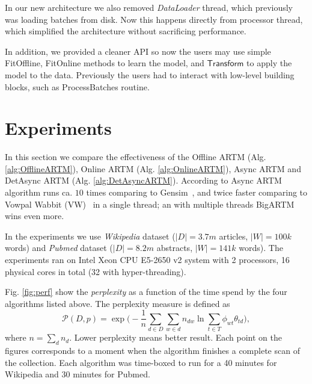 \documentclass[russian,english]{llncs}
\newcommand{\kw}[1]{\textsf{#1}}
\begin{document}
In our new architecture we also removed \emph{DataLoader} thread, which previously was loading batches from disk.
Now this happens directly from processor thread, which simplified the architecture without sacrificing performance.

In addition, we provided a cleaner API so now the users may use simple \kw{FitOffline}, \kw{FitOnline} methods to learn the model,
and $\kw{Transform}$ to apply the model to the data.
Previously the users had to interact with low-level building blocks, such as \kw{ProcessBatches} routine.

\section{Experiments}
\label{sec:Experiments}

In this section we compare the effectiveness of the
\kw{Offline ARTM} (Alg. \ref{alg:OfflineARTM}),
\kw{Online ARTM} (Alg. \ref{alg:OnlineARTM}),
\kw{Async ARTM} \cite{vfardi15aist} and
\kw{DetAsync ARTM} (Alg. \ref{alg:DetAsyncARTM}).
According to \cite{vfardi15aist} \kw{Async ARTM} algorithm
runs ca. $10$ times comparing to Gensim~\cite{rehurek10software},
and twice faster comparing to 
Vowpal Wabbit (VW)~\cite{langford07vw}
in a single thread;
an with multiple threads BigARTM wins even more.

In the experiments we use \emph{Wikipedia} dataset ($|D| = 3.7m$ articles, $|W| = 100k$ words)
and \emph{Pubmed} dataset ($|D| = 8.2m$ abstracts, $|W| = 141k$ words).
The experiments ran on Intel Xeon CPU E5-2650 v2 system with 2 processors, 16 physical cores in total (32 with hyper-threading).


Fig. \ref{fig:perf} show the \emph{perplexity} as a function of the time spend by the four algorithms listed above.
The perplexity measure is defined as
\begin{equation}
\label{eq:perplexity}
\mathscr{P}(D, p) =
\exp \biggl( - \frac{1}{n} \sum_{d \in D} \sum_{w \in d} n_{dw} \ln \sum_{t\in T} \phi_{wt} \theta_{td} \biggr),
\end{equation}
 where $n = \sum_d n_d$. Lower perplexity means better result.
Each point on the figures corresponds to a moment when the algorithm finishes a complete scan of the collection.
Each algorithm was time-boxed to run for a 40 minutes for Wikipedia and 30 minutes for Pubmed.
\end{document}
